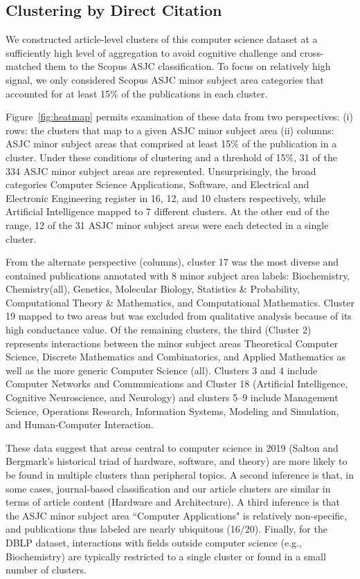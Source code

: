 \subsection{Clustering by Direct Citation} 




We constructed article-level clusters of this computer science dataset at a sufficiently high level of aggregation to avoid cognitive challenge and cross-matched them to  the  Scopus ASJC classification. 
To focus on relatively high signal, we only considered Scopus ASJC minor subject area categories that accounted for at least 15\% of the publications in each cluster. 

Figure~\ref{fig:heatmap} permits examination of these data from two perspectives: (i) rows: the clusters that map to a given ASJC minor subject area (ii) columns: ASJC minor subject areas that comprised at least 15\% of the publication in a cluster. Under these conditions of clustering and a threshold of 15\%, 31 of the 334 ASJC minor subject areas are represented. Unsurprisingly, the broad categories Computer Science Applications, Software, and Electrical and Electronic Engineering register in 16, 12, and 10 clusters respectively, while Artificial Intelligence mapped to 7 different clusters. 
At the other end of the range, 12 of the 31 ASJC minor subject areas were each detected in a single cluster. 

From the alternate perspective (columns), cluster 17 was the most diverse and contained publications annotated with 8 minor subject area labels: Biochemistry, Chemistry(all), Genetics, Molecular Biology,  Statistics \& Probability, Computational Theory \& Mathematics, and Computational Mathematics. Cluster 19 mapped to two areas but was excluded from qualitative analysis because of its high conductance value. Of the remaining clusters, the third (Cluster 2) represents interactions between the minor subject areas Theoretical Computer Science, Discrete Mathematics and Combinatorics, and Applied Mathematics as well as the more generic Computer Science (all). Clusters 3 and 4 include Computer Networks and Communications and Cluster 18 (Artificial Intelligence, Cognitive Neuroscience, and Neurology) and clusters 5--9 include Management Science, Operations Research, Information Systems, Modeling and Simulation, and Human-Computer Interaction.

These data suggest that areas central to computer science in 2019 (Salton and Bergmark's historical triad of hardware, software, and theory) are more likely to be found in multiple clusters than peripheral topics.
A second inference is that, in some cases, journal-based classification and our article clusters are similar in terms of article content (Hardware and Architecture). 
A third inference is that the ASJC minor subject area ``Computer Applications" is relatively non-specific, and publications thus labeled are nearly ubiquitous (16/20).  Finally,   for the DBLP dataset, interactions with fields outside computer science (e.g., Biochemistry)  are  typically restricted to a single cluster or found in a small number of clusters.

